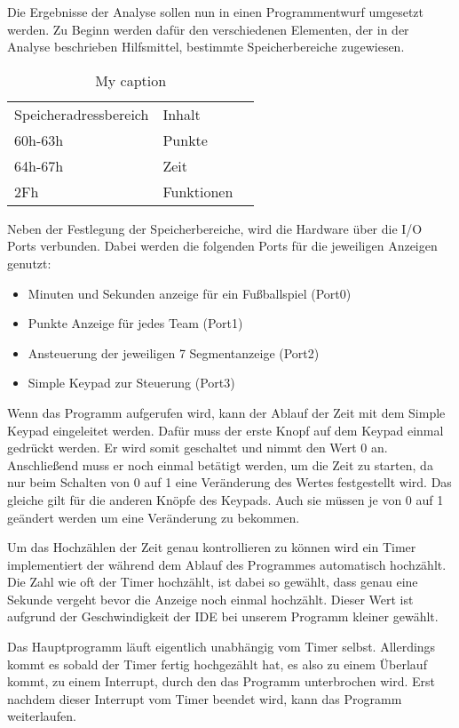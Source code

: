 Die Ergebnisse der Analyse sollen nun in einen Programmentwurf umgesetzt werden. Zu Beginn werden dafür den verschiedenen Elementen, der in der Analyse beschrieben Hilfsmittel, bestimmte Speicherbereiche zugewiesen.
\begin{table}[H]
	\centering
	\caption{My caption}
	\label{my-label}
	\begin{tabular}{lll}
		Speicheradressbereich & Inhalt  \\
		60h-63h & Punkte  \\
		64h-67h & Zeit   \\
		2Fh & Funktionen  
	\end{tabular}
\end{table}

Neben der Festlegung der Speicherbereiche, wird die Hardware über die I/O Ports verbunden. Dabei werden die folgenden Ports für die jeweiligen Anzeigen genutzt:
\begin{itemize}
	\item Minuten und Sekunden anzeige für ein Fußballspiel (Port0)
	\item Punkte Anzeige für jedes Team  (Port1)
	\item Ansteuerung der jeweiligen 7 Segmentanzeige (Port2)
	\item Simple Keypad zur Steuerung (Port3)
\end{itemize}  


Wenn das Programm aufgerufen wird, kann der Ablauf der Zeit mit dem Simple Keypad eingeleitet werden. Dafür muss der erste Knopf auf dem Keypad einmal gedrückt werden. Er wird somit geschaltet und nimmt den Wert 0 an. Anschließend muss er noch einmal betätigt werden, um die Zeit zu starten, da nur beim Schalten von 0 auf 1 eine Veränderung des Wertes festgestellt wird. Das gleiche gilt für die anderen Knöpfe des Keypads. Auch sie müssen je von 0 auf 1 geändert werden um eine Veränderung zu bekommen. 

Um das Hochzählen der Zeit genau kontrollieren zu können wird ein Timer implementiert der während dem Ablauf des Programmes automatisch hochzählt. Die Zahl wie oft der Timer hochzählt, ist dabei so gewählt, dass genau eine Sekunde vergeht bevor die Anzeige noch einmal hochzählt. Dieser Wert ist aufgrund der Geschwindigkeit der IDE bei unserem Programm kleiner gewählt. 

Das Hauptprogramm läuft eigentlich unabhängig vom Timer selbst. Allerdings kommt es sobald der Timer fertig hochgezählt hat, es also zu einem Überlauf kommt, zu einem Interrupt, durch den das Programm unterbrochen wird. Erst nachdem dieser Interrupt vom Timer beendet wird, kann das Programm weiterlaufen. 

 
 
 